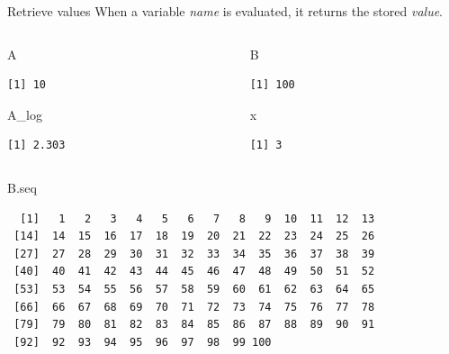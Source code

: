 \documentclass[
  11pt,
  ignorenonframetext,
]{beamer}
\newenvironment{Shaded}{\begin{snugshade}}{\end{snugshade}}
\newcommand{\NormalTok}[1]{#1}
\begin{document}
\begin{frame}{Retrieve values}
\protect\hypertarget{retrieve-values}{}
When a variable \emph{name} is evaluated, it returns the stored
\emph{value}.

\begin{columns}[T,onlytextwidth]
\begin{column}{0.45\textwidth}
\begin{Shaded}
\begin{Highlighting}[]
\NormalTok{A}
\end{Highlighting}
\end{Shaded}

\begin{verbatim}
[1] 10
\end{verbatim}

\begin{Shaded}
\begin{Highlighting}[]
\NormalTok{A\_log}
\end{Highlighting}
\end{Shaded}

\begin{verbatim}
[1] 2.303
\end{verbatim}
\end{column}

\begin{column}{0.45\textwidth}
\begin{Shaded}
\begin{Highlighting}[]
\NormalTok{B}
\end{Highlighting}
\end{Shaded}

\begin{verbatim}
[1] 100
\end{verbatim}

\begin{Shaded}
\begin{Highlighting}[]
\NormalTok{x}
\end{Highlighting}
\end{Shaded}

\begin{verbatim}
[1] 3
\end{verbatim}
\end{column}
\end{columns}

\begin{Shaded}
\begin{Highlighting}[]
\NormalTok{B.seq}
\end{Highlighting}
\end{Shaded}

\begin{verbatim}
  [1]   1   2   3   4   5   6   7   8   9  10  11  12  13
 [14]  14  15  16  17  18  19  20  21  22  23  24  25  26
 [27]  27  28  29  30  31  32  33  34  35  36  37  38  39
 [40]  40  41  42  43  44  45  46  47  48  49  50  51  52
 [53]  53  54  55  56  57  58  59  60  61  62  63  64  65
 [66]  66  67  68  69  70  71  72  73  74  75  76  77  78
 [79]  79  80  81  82  83  84  85  86  87  88  89  90  91
 [92]  92  93  94  95  96  97  98  99 100
\end{verbatim}
\end{frame}
\end{document}
